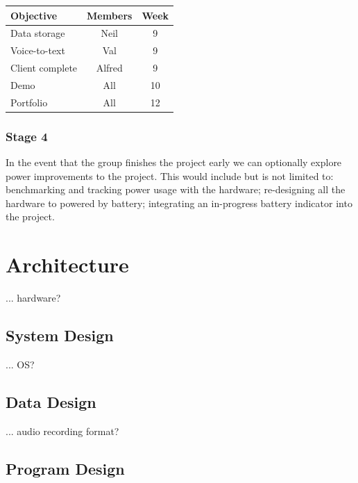 \documentclass[11pt,a4paper,titlepage]{report}
\begin{document}
\begin{center}
\begin{table}[H]
\begin{tabular}{|l|c|c|}
    \hline
    \textbf{Objective} & \textbf{Members} & \textbf{Week} \\ \hline

    Data storage & Neil & 9 \\ \hline    
    Voice-to-text & Val & 9 \\ \hline    
    Client complete & Alfred & 9 \\ \hline    
    Demo & All & 10 \\ \hline    
    Portfolio & All & 12 \\ \hline    

\end{tabular}
\end{table}
\end{center}

\subsubsection{Stage 4}

In the event that the group finishes the project early we can optionally explore power improvements to the project. This would include but is not limited to: benchmarking and tracking power usage with the hardware; re-designing all the hardware to powered by battery; integrating an in-progress battery indicator into the project.



\section{Architecture}

... hardware?

\subsection{System Design}

... OS?

\subsection{Data Design}

... audio recording format?

\subsection{Program Design}
\end{document}
